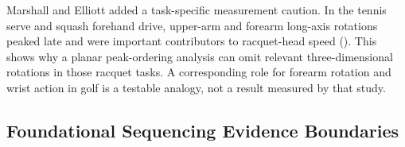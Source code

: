 \documentclass[
  letterpaper,
]{report}
\begin{document}
Marshall and Elliott added a task-specific measurement caution. In the
tennis serve and squash forehand drive, upper-arm and forearm long-axis
rotations peaked late and were important contributors to racquet-head
speed (). This
shows why a planar peak-ordering analysis can omit relevant
three-dimensional rotations in those racquet tasks. A corresponding role
for forearm rotation and wrist action in golf is a testable analogy, not
a result measured by that study.

\subsection{Foundational Sequencing Evidence
Boundaries}\label{foundational-sequencing-evidence-boundaries}
\end{document}
